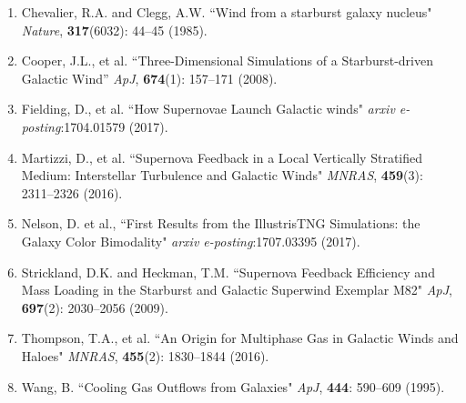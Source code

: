 \documentclass[11pt,letterpaper,english]{article}
\begin{document}
\begin{enumerate}\itemsep0pt
\item Chevalier, R.A. and Clegg, A.W. ``Wind from a starburst galaxy nucleus" \emph{Nature}, \textbf{317}(6032): 44--45 (1985). \\
\item Cooper, J.L., et al. ``Three-Dimensional Simulations of a Starburst-driven Galactic Wind'' \emph{ApJ}, \textbf{674}(1): 157--171 (2008). \\
\item Fielding, D., et al. ``How Supernovae Launch Galactic winds" \emph{arxiv e-posting}:1704.01579 (2017). \\
\item Martizzi, D., et al. ``Supernova Feedback in a Local Vertically Stratified Medium: Interstellar Turbulence and Galactic Winds" \emph{MNRAS}, \textbf{459}(3): 2311--2326 (2016). \\
\item Nelson, D. et al., ``First Results from the IllustrisTNG Simulations: the Galaxy Color Bimodality" \emph{arxiv e-posting}:1707.03395 (2017). \\
\item Strickland, D.K. and Heckman, T.M. ``Supernova Feedback Efficiency and Mass Loading in the Starburst and Galactic Superwind Exemplar M82" \emph{ApJ}, \textbf{697}(2): 2030--2056 (2009). \\
\item Thompson, T.A., et al. ``An Origin for Multiphase Gas in Galactic Winds and Haloes" \emph{MNRAS}, \textbf{455}(2): 1830--1844 (2016). \\
\item Wang, B. ``Cooling Gas Outflows from Galaxies" \emph{ApJ}, \textbf{444}: 590--609 (1995). \\

\end{enumerate}
\end{document}

